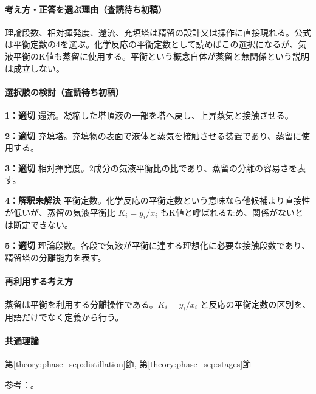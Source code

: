 \paragraph{考え方・正答を選ぶ理由（査読待ち初稿）} 理論段数、相対揮発度、還流、充填塔は精留の設計又は操作に直接現れる。公式は平衡定数の4を選ぶ。化学反応の平衡定数として読めばこの選択になるが、気液平衡のK値も蒸留に使用する。平衡という概念自体が蒸留と無関係という説明は成立しない。

\paragraph{選択肢の検討（査読待ち初稿）}\mbox{}\par

\noindent\textbf{1：適切} 還流。凝縮した塔頂液の一部を塔へ戻し、上昇蒸気と接触させる。\par

\noindent\textbf{2：適切} 充填塔。充填物の表面で液体と蒸気を接触させる装置であり、蒸留に使用する。\par

\noindent\textbf{3：適切} 相対揮発度。2成分の気液平衡比の比であり、蒸留の分離の容易さを表す。\par

\noindent\textbf{4：解釈未解決} 平衡定数。化学反応の平衡定数という意味なら他候補より直接性が低いが、蒸留の気液平衡比 \(K_i=y_i/x_i\) もK値と呼ばれるため、関係がないとは断定できない。\par

\noindent\textbf{5：適切} 理論段数。各段で気液が平衡に達する理想化に必要な接触段数であり、精留塔の分離能力を表す。\par

\paragraph{再利用する考え方} 蒸留は平衡を利用する分離操作である。\(K_i=y_i/x_i\) と反応の平衡定数の区別を、用語だけでなく定義から行う。

\paragraph{共通理論} \hyperref[theory:phase_sep:distillation]{第\ref*{theory:phase_sep:distillation}節}, \hyperref[theory:phase_sep:stages]{第\ref*{theory:phase_sep:stages}節}

\par 参考：\cite{nptel_distillation1}。

